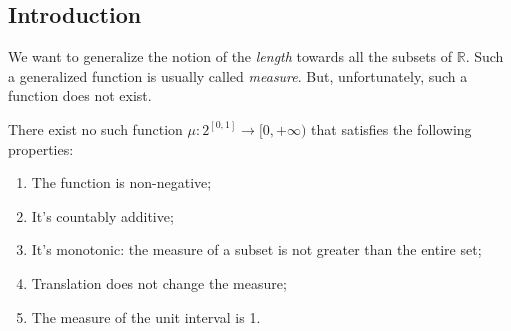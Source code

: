 
\subsection{Introduction}

We want to generalize the notion of the \textit{length} towards all 
the subsets of $\mathbb{R}$.
Such a generalized function is usually called \textit{measure}.
But, unfortunately, such a function does not exist.

\begin{theorem}
\label{the:measureNotExists}
    There exist no such function $\mu: 2^{[0,1]} \to [0, +\infty)$ that satisfies the 
    following properties:
    \begin{enumerate}
        \item {
            The function is non-negative;
        }
        \item {
            It's countably additive;
        }
        \item {
            It's monotonic: the measure of a subset is not greater than the entire set;
        }
        \item {
            Translation does not change the measure;
        }
        \item {
            The measure of the unit interval is 1.
        }
    \end{enumerate}
\end{theorem}

